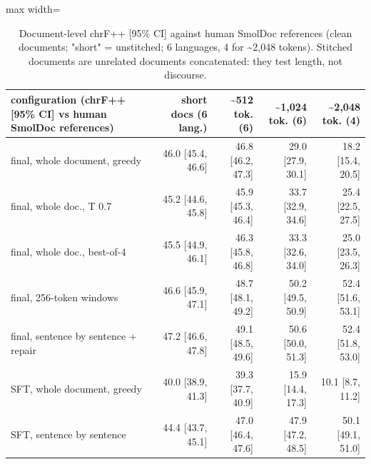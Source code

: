 \begin{table}[t]
\centering
\footnotesize
\setlength{\tabcolsep}{3pt}
\caption{Document-level chrF++ {[}95\% CI{]} against human SmolDoc references (clean documents; "short" = unstitched; 6 languages, 4 for \textasciitilde2,048 tokens). Stitched documents are unrelated documents concatenated: they test length, not discourse.}
\label{tab:t_longdoc_human}
\begin{adjustbox}{max width=\linewidth}
{\def\LTcaptype{none} %
\begin{tabular}{@{}lrrrr@{}}
\toprule
configuration (chrF++ {[}95\% CI{]} vs human SmolDoc references) & short docs (6 lang.) & \textasciitilde512 tok. (6) & \textasciitilde1,024 tok. (6) & \textasciitilde2,048 tok. (4) \\
\midrule
final, whole document, greedy & 46.0 {[}45.4, 46.6{]} & 46.8 {[}46.2, 47.3{]} & 29.0 {[}27.9, 30.1{]} & 18.2 {[}15.4, 20.5{]} \\
final, whole doc., T 0.7 & 45.2 {[}44.6, 45.8{]} & 45.9 {[}45.3, 46.4{]} & 33.7 {[}32.9, 34.6{]} & 25.4 {[}22.5, 27.5{]} \\
final, whole doc., best-of-4 & 45.5 {[}44.9, 46.1{]} & 46.3 {[}45.8, 46.8{]} & 33.3 {[}32.6, 34.0{]} & 25.0 {[}23.5, 26.3{]} \\
final, 256-token windows & 46.6 {[}45.9, 47.1{]} & 48.7 {[}48.1, 49.2{]} & 50.2 {[}49.5, 50.9{]} & 52.4 {[}51.6, 53.1{]} \\
final, sentence by sentence + repair & 47.2 {[}46.6, 47.8{]} & 49.1 {[}48.5, 49.6{]} & 50.6 {[}50.0, 51.3{]} & 52.4 {[}51.8, 53.0{]} \\
SFT, whole document, greedy & 40.0 {[}38.9, 41.3{]} & 39.3 {[}37.7, 40.9{]} & 15.9 {[}14.4, 17.3{]} & 10.1 {[}8.7, 11.2{]} \\
SFT, sentence by sentence & 44.4 {[}43.7, 45.1{]} & 47.0 {[}46.4, 47.6{]} & 47.9 {[}47.2, 48.5{]} & 50.1 {[}49.1, 51.0{]} \\
\bottomrule
\end{tabular}
}
\end{adjustbox}
\end{table}


